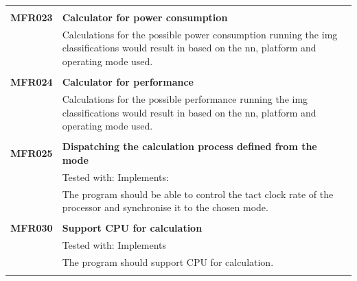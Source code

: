 \documentclass[parskip=full]{scrartcl}
\begin{document}
\begin{tabular}{p{2cm}p{12cm}}
& \\
\textbf{MFR023} & \textbf{Calculator for power consumption}\\                                     
& Calculations for the possible power consumption running the \gls{img} classifications would result in based on the \gls{nn}, platform and operating mode used.\\
& \\
\textbf{MFR024} & \textbf{Calculator for performance}\\                                     
& Calculations for the possible performance running the \gls{img} classifications would result in based on the \gls{nn}, platform and operating mode used.\\
& \\
\textbf {MFR025} & \textbf{Dispatching the calculation process defined from the mode}\\
& Tested with: Implements: \\
& The program should be able to control the tact clock rate of the processor and synchronise it to the chosen mode. \\
& \\
\textbf {MFR030} & \textbf{Support CPU for calculation} \\
& Tested with: Implements \\
& The program should support CPU for calculation. \\
& \\
\end{tabular}
\newpage
\end{document}
